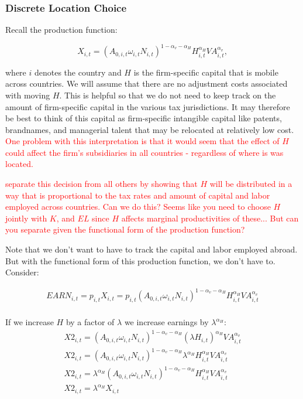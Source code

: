 \subsubsection{Discrete Location Choice}

Recall the production function:

\begin{equation}
X_{i,t} = (A_{0,i,t}\omega_{i,t}N_{i,t})^{1-\alpha_{v}-\alpha_{H}}H_{i,t}^{\alpha_{H}}VA_{i,t}^{\alpha_{v}},
\end{equation}

\noindent\noindent where $i$ denotes the country and $H$ is the firm-specific capital that is mobile across countries.  We will assume that there are no adjustment costs associated with moving $H$.  This is helpful so that we do not need to keep track on the amount of firm-specific capital in the various tax jurisdictions.  It may therefore be best to think of this capital as firm-specific intangible capital like patents, brandnames, and managerial talent that may be relocated at relatively low cost. \textcolor{red}{One problem with this interpretation is that it would seem that the effect of $H$ could affect the firm's subsidiaries in all countries - regardless of where is was located.}

\textcolor{red}{\citet{DD2009} separate this decision from all others by showing that $H$ will be distributed in a way that is proportional to the tax rates and amount of capital and labor employed across countries.  Can we do this?  Seems like you need to choose $H$ jointly with $K$, and $EL$ since $H$ affects marginal productivities of these... But can you separate given the functional form of the production function?} 

Note that we don't want to have to track the capital and labor employed abroad.  But with the functional form of this production function, we don't have to.  Consider:

\begin{equation}
\begin{split}
 EARN_{i,t}=p_{i,t}X_{i,t} = p_{i,t}(A_{0,i,t}\omega_{i,t}N_{i,t})^{1-\alpha_{v}-\alpha_{H}}H_{i,t}^{\alpha_{H}}VA_{i,t}^{\alpha_{v}} \\
\end{split}
\end{equation}

If we increase $H$ by a factor of $\lambda$ we increase earnings by $\lambda^{\alpha_{H}}$:
\begin{equation}
\begin{split}
X2_{i,t} = (A_{0,i,t}\omega_{i,t}N_{i,t})^{1-\alpha_{v}-\alpha_{H}}(\lambda H_{i,t})^{\alpha_{H}}VA_{i,t}^{\alpha_{v}} \\
X2_{i,t} = (A_{0,i,t}\omega_{i,t}N_{i,t})^{1-\alpha_{v}-\alpha_{H}}\lambda^{\alpha_{H}} H_{i,t}^{\alpha_{H}}VA_{i,t}^{\alpha_{v}} \\
X2_{i,t} = \lambda^{\alpha_{H}}(A_{0,i,t}\omega_{i,t}N_{i,t})^{1-\alpha_{v}-\alpha_{H}} H_{i,t}^{\alpha_{H}}VA_{i,t}^{\alpha_{v}} \\
X2_{i,t} = \lambda^{\alpha_{H}}X_{i,t}
\end{split}
\end{equation}

